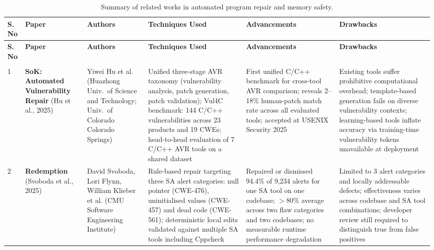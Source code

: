 {%
\renewcommand{\arraystretch}{1.3}
\setlength{\tabcolsep}{4pt}
\footnotesize
\begin{longtable}{|>{\centering\arraybackslash}p{0.6cm}|>{\raggedright\arraybackslash}p{1.9cm}|p{2.5cm}|p{3.0cm}|p{3.0cm}|p{3.0cm}|}

\caption{Summary of related works in automated program repair and memory safety.}
\label{tab:lit_review} \\

\hline
\textbf{S.\,No} & \textbf{Paper} & \textbf{Authors} & \textbf{Techniques Used} & \textbf{Advancements} & \textbf{Drawbacks} \\
\hline
\endfirsthead

\hline
\textbf{S.\,No} & \textbf{Paper} & \textbf{Authors} & \textbf{Techniques Used} & \textbf{Advancements} & \textbf{Drawbacks} \\
\hline
\endhead

\multicolumn{6}{r}{\textit{(Continued on next page\ldots)}} \\
\endfoot

\hline
\endlastfoot

1 &
\textbf{SoK: Automated Vulnerability Repair} \newline \cite{b1} \newline (Hu et al., 2025) &
Yiwei Hu et al. \newline (Huazhong Univ.\ of Science and Technology; Univ.\ of Colorado Colorado Springs) &
Unified three-stage AVR taxonomy (vulnerability analysis, patch generation, patch validation); Vul4C benchmark: 144 C/C++ vulnerabilities across 23 products and 19 CWEs; head-to-head evaluation of 7 C/C++ AVR tools on a shared dataset &
First unified C/C++ benchmark for cross-tool AVR comparison; reveals 2--18\% human-patch match rate across all evaluated tools; accepted at USENIX Security 2025 &
Existing tools suffer prohibitive computational overhead; template-based generation fails on diverse vulnerability contexts; learning-based tools inflate accuracy via training-time vulnerability tokens unavailable at deployment \\
\hline

2 &
\textbf{Redemption} \newline \cite{b2} \newline (Svoboda et al., 2025) &
David Svoboda, Lori Flynn, William Klieber et al. \newline (CMU Software Engineering Institute) &
Rule-based repair targeting three SA alert categories: null pointer (CWE-476), uninitialised values (CWE-457) and dead code (CWE-561); deterministic local edits validated against multiple SA tools including Cppcheck &
Repaired or dismissed 94.4\% of 9,234 alerts for one SA tool on one codebase; $>$80\% average across two flaw categories and two codebases; no measurable runtime performance degradation &
Limited to 3 alert categories and locally addressable defects; effectiveness varies across codebase and SA tool combinations; developer review still required to distinguish true from false positives \\
\hline


\end{longtable}}
